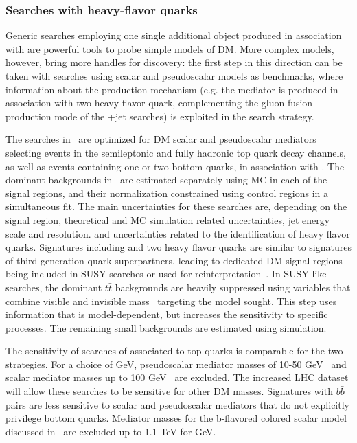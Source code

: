 
\subsubsection{Searches with heavy-flavor quarks}

Generic searches employing one single additional object produced in association with \MET
are powerful tools to probe simple models of DM. More complex models, however, bring 
more handles for discovery: the first step in this direction can be taken with searches using 
scalar and pseudoscalar models as benchmarks, where information about the production mechanism 
(e.g. the mediator is produced in association with two heavy flavor quark, complementing the
gluon-fusion production mode of the \MET+jet searches) is exploited in 
the search strategy. 

The searches in~\cite{Aaboud:2017rzf,CMS-PAS-EXO-16-051}
are optimized for DM scalar and pseudoscalar mediators
selecting events in the semileptonic and fully hadronic top quark decay channels,
as well as events containing one or two bottom quarks, in association with \MET. 
The dominant backgrounds in~\cite{Aaboud:2017rzf} are estimated separately
using MC in each of the signal regions,
and their normalization constrained using control regions in a simultaneous fit.
The main uncertainties for these searches are, depending on the signal region, 
theoretical and MC simulation related uncertainties, jet energy scale and resolution. 
and uncertainties related to the identification of heavy flavor quarks. 
Signatures including \MET and two heavy flavor quarks are similar to 
signatures of third generation quark superpartners, leading to dedicated
DM signal regions being included in SUSY searches or used
for reinterpretation~\cite{Aaboud:2017aeu,CMS-PAS-SUS-17-001}. 
In SUSY-like searches, the dominant $t\bar{t}$ backgrounds
are heavily suppressed using variables that combine visible and invisible
mass~\cite{Lester:1999tx} targeting the model sought. 
This step uses information that is model-dependent,
but increases the sensitivity to specific processes. The remaining
small backgrounds are estimated using simulation. 

The sensitivity of searches of \MET associated to top quarks
is comparable for the two strategies. 
For a choice of  GeV, pseudoscalar mediator masses of 10-50
GeV~\cite{AAaboud:2017aeu} and scalar mediator masses up to 100
GeV~\cite{CMS-PAS-SUS-17-001} are excluded. 
The increased LHC dataset 
will allow these searches to be sensitive for other DM masses. 
Signatures with $b\bar{b}$ pairs are less sensitive to
scalar and pseudoscalar mediators that do not explicitly
privilege bottom quarks. Mediator masses for the b-flavored colored scalar 
model discussed in~\cite{Agrawal:2014una} are excluded up to 1.1 TeV
for  GeV. 

